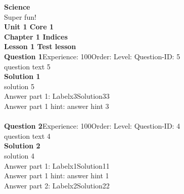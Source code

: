 \documentclass{article}
\begin{document}
\noindent\Huge{\textbf{Science}}\\[5pt]
\noindent\large{Super fun!}\\[20pt]
\noindent\huge{\textbf{Unit 1 Core 1}}\\[18pt]
\noindent\huge{\textbf{Chapter 1 Indices}}\\[15pt]
\noindent\huge{\textbf{Lesson 1 Test lesson}}\\[12pt]
\noindent\textbf{Question 1}\hspace{20pt}Experience: 100\hspace{20pt}Order: \hspace{20pt}Level: \hspace{20pt}Question-ID: 5\\[2pt]
question text 5\\[4pt]
\noindent\textbf{Solution 1}\\[2pt]
solution 5\\[4pt]
Answer part 1: \hspace{10pt}Label\hspace{10pt}x3\hspace{10pt}Solution\hspace{10pt}33\\
Answer part 1 hint: \hspace{15pt}answer hint 3\\
\\[4pt]
\noindent\textbf{Question 2}\hspace{20pt}Experience: 100\hspace{20pt}Order: \hspace{20pt}Level: \hspace{20pt}Question-ID: 4\\[2pt]
question text 4\\[4pt]
\noindent\textbf{Solution 2}\\[2pt]
solution 4\\[4pt]
Answer part 1: \hspace{10pt}Label\hspace{10pt}x1\hspace{10pt}Solution\hspace{10pt}11\\
Answer part 1 hint: \hspace{15pt}answer hint 1\\
Answer part 2: \hspace{10pt}Label\hspace{10pt}x2\hspace{10pt}Solution\hspace{10pt}22\\
\end{document}
